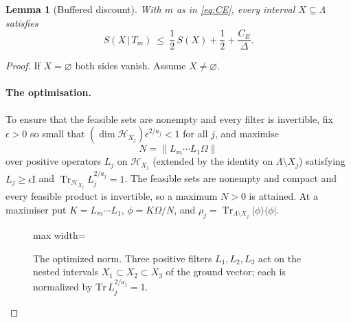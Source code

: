 \documentclass[aps,prx,reprint,superscriptaddress,floatfix,nofootinbib,longbibliography,amsmath,amssymb]{revtex4-2}
\newcommand{\id}{\mathrm{I}}
\newcommand{\Tr}{\operatorname{Tr}}
\newcommand{\norm}[1]{\lVert #1\rVert}
\providecommand{\ket}[1]{|#1\rangle}\renewcommand{\ket}[1]{|#1\rangle}
\providecommand{\bra}[1]{\langle #1|}\renewcommand{\bra}[1]{\langle #1|}
\newcommand{\cH}{\mathcal H}
\newcommand{\Om}{\Omega}
\newcommand{\Lam}{\Lambda}
\theoremstyle{plain}
\newtheorem{lemma}[theorem]{Lemma}
\theoremstyle{definition}
\begin{document}
\begin{lemma}[Buffered discount]\label{lem:buffer}
With $m$ as in \eqref{eq:CE}, every interval $X\subseteq\Lam$ satisfies
\begin{equation}\label{eq:discount}
 S(X\,|\,T_m)\ \le\ \frac12\,S(X)+\frac12+\frac{C_E}{\Delta}.
\end{equation}
\end{lemma}

\begin{proof}
If $X=\varnothing$ both sides vanish. Assume $X\ne\varnothing$.

\paragraph{The optimisation.}
To ensure that the feasible sets are nonempty and every filter is invertible,
fix $\epsilon>0$ so small that $(\dim\cH_{X_j})\epsilon^{2/a_j}<1$ for all
$j$, and maximise
\[
 N=\norm{L_m\cdots L_1\Om}
\]
over positive operators $L_j$ on $\cH_{X_j}$ (extended by the identity on
$\Lam\setminus X_j$) satisfying $L_j\ge\epsilon\id$ and
$\Tr_{\cH_{X_j}}L_j^{2/a_j}=1$. The feasible sets are nonempty and compact
and every feasible product is invertible, so a maximum $N>0$ is attained.
At a maximiser put $K=L_m\cdots L_1$, $\phi=K\Om/N$, and
$\rho_j=\Tr_{\Lam\setminus X_j}\ket\phi\bra\phi$.

\begin{figure}[t]
\centering
\begin{adjustbox}{max width=\linewidth}

\end{adjustbox}
\caption{The optimized norm. Three positive filters $L_1,L_2,L_3$ act on the nested intervals $X_1\subset X_2\subset X_3$ of the ground vector; each is normalized by $\mathrm{Tr}\,L_j^{2/a_j}=1$.}\label{fig:filter-product}
\end{figure}


\end{proof}
\end{document}
